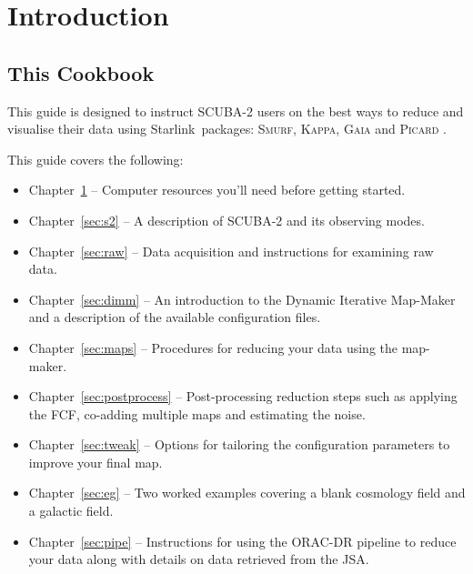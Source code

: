 \documentclass[twoside,11pt]{article}
\newcommand{\htmladdnormallink}[2]{#1}
\newcommand{\htmlref}[2]{#1}
\newcommand{\latexhtml}[2]{#1}
\newcommand{\xref}[3]{#1}
\newcommand{\xlabel}[1]{}
\renewcommand{\_}{\texttt{\symbol{95}}}
\newcommand{\starlink}{\htmladdnormallink{Starlink}{http://starlink.jach.hawaii.edu}}
\newcommand{\gaia}{\xref{\textsc{Gaia}}{sun214}{}}
\newcommand{\Kappa}{\xref{\textsc{Kappa}}{sun95}{}}
\newcommand{\picard}{\xref{\textsc{Picard}}{sun265}{}}
\newcommand{\smurf}{\xref{\textsc{Smurf}}{sun258}{}}
\newcommand{\cref}[3]{\latexhtml{#1~\ref{#2}}{\htmlref{#3}{#2}}}
\renewcommand{\thepage}{\roman{page}}
\begin{document}
\cleardoublepage
\renewcommand{\thepage}{\arabic{page}}
\setcounter{page}{1}

\section{\xlabel{introduction}Introduction}
\label{sec:intro}

\subsection{\xlabel{using_guide}This Cookbook}


This guide is designed to instruct SCUBA-2 users on the best ways to
reduce and visualise their data using \starlink\ packages:
\smurf \cite{smurf}, \Kappa \cite{kappa}, \gaia \cite{gaia} and \picard
\cite{picard}.

This guide covers the following:
\begin{itemize}
\itemsep0em
\item \cref{Chapter}{sec:intro}{Chapter 1} -- Computer resources you'll need before getting started.
\item \cref{Chapter}{sec:s2}{Chapter 2} -- A description of SCUBA-2 and its observing modes.
\item \cref{Chapter}{sec:raw}{Chapter 3}  -- Data acquisition and instructions for examining raw data.
\item \cref{Chapter}{sec:dimm}{Chapter 4}  -- An introduction to the Dynamic Iterative Map-Maker and a description of the available configuration files.
\item \cref{Chapter}{sec:maps}{Chapter 5}  -- Procedures for reducing your data using the map-maker.
\item \cref{Chapter}{sec:postprocess}{Chapter 6}  -- Post-processing reduction steps such as applying the FCF, co-adding multiple maps and estimating the noise.
\item \cref{Chapter}{sec:tweak}{Chapter 7}  -- Options for tailoring the configuration parameters to improve your final map.
\item \cref{Chapter}{sec:eg}{Chapter 8}  -- Two worked examples covering a \htmlref{blank cosmology field}{sec:cosmology} and a \htmlref{galactic field}{sec:bright_ex}.
\item \cref{Chapter}{sec:pipe}{Chapter 9}  -- Instructions for using the ORAC-DR pipeline to reduce your data along with details on data retrieved from the JSA.
\end{itemize}
\end{document}
